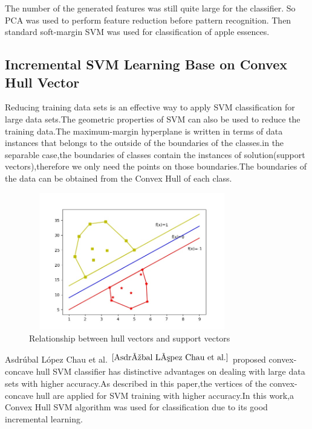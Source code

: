 \documentclass[a4paper]{article}
\begin{document}
The number of the generated features was still quite large for  the  classifier.  So  PCA  was  used  to  perform  feature reduction  before  pattern  recognition.  Then  standard soft-margin  SVM  was  used  for  classification  of  apple essences.

\subsection{Incremental SVM Learning Base on Convex Hull Vector}
Reducing training data sets is an effective way to apply SVM classification for large data sets.The geometric properties of SVM can also be used to reduce the training data.The maximum-margin hyperplane is written in terms of data instances that belongs to the outside of the boundaries of the classes.in the separable case,the boundaries of classes contain the instances of solution(support vectors),therefore we only need the points on those boundaries.The boundaries of the data can be obtained from the Convex Hull of each class.




\begin{figure}[h]
  \centering
  \includegraphics[width=9cm,height=6cm]{HullVector_SupportVector}
  \caption{Relationship between hull vectors and support vectors}
\end{figure}
Asdrúbal López Chau et al. $ ^{\cite{Asdrúbal López Chau et al.}}$ proposed convex-concave hull SVM classiﬁer has distinctive advantages on dealing with large data sets with higher accuracy.As described in this paper,the vertices of the convex-concave hull are applied for SVM training with higher accuracy.In this work,a Convex Hull SVM algorithm was used for classification due to its good incremental learning.
\end{document}
